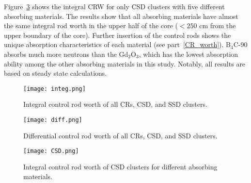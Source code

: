 Figure~\ref{fig:CSD} shows the integral CRW for only CSD clusters with five 
different absorbing materials. The results show that all absorbing materials 
have almost the same integral rod worth in the upper half of the core 
($<250$ cm from the upper boundary of the core). Further insertion of the 
control rods shows the unique absorption characteristics of each material (see 
part~\ref{CR_worth}). B$_4$C-90 absorbs much more neutrons than the 
Gd$_2$O$_3$, which has the lowest absorption ability among the other absorbing 
materials in this study. Notably, all results are based on steady state calculations. 

\begin{figure}
	\centering
	\texttt{[image: integ.png]}
	\vspace{-0.5in}
	\caption{Integral control rod worth of all CRs, CSD, and SSD clusters.} 
	\label{fig:integ}
\end{figure}
\begin{figure}
	\centering
	\texttt{[image: diff.png]}
	\vspace{-0.5in}
	\caption{Differential control rod worth of all CRs, CSD, and SSD clusters.} 
	\label{fig:diff}
\end{figure}
\begin{figure}
	\centering
	\texttt{[image: CSD.png]}
	\vspace{-0.5in}
	\caption{Integral control rod worth of CSD clusters for different absorbing materials.} 
	\label{fig:CSD}
\end{figure}
